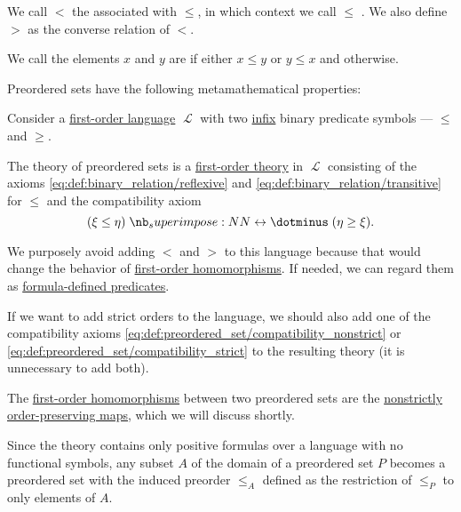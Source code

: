 \begin{definition}
\begin{thmenum}[series=def:preordered_set]
    We call \( < \) the  associated with \( \leq \), in which context we call \( \leq \) . We also define \( > \) as the converse relation of \( < \).

     We call the elements \( x \) and \( y \) are  if either \( x \leq y \) or \( y \leq x \) and  otherwise.
  \end{thmenum}

  Preordered sets have the following metamathematical properties:
  \begin{thmenum}[resume=def:preordered_set]
     Consider a \hyperref[def:first_order_language]{first-order language} \( \mscrL \) with two \hyperref[def:function_application_syntax]{infix} binary predicate symbols --- \( \leq \) and \( \geq \).

    The theory of preordered sets is a \hyperref[def:first_order_theory]{first-order theory} in \( \mscrL \) consisting of the axioms \eqref{eq:def:binary_relation/reflexive} and \eqref{eq:def:binary_relation/transitive} for \( \leq \) and the compatibility axiom
    \begin{equation}\label{eq:def:preordered_set/theory}
      (\xi \leq \eta) \syniff (\eta \geq \xi).
    \end{equation}

    We purposely avoid adding \( < \) and \( > \) to this language because that would change the behavior of \hyperref[def:first_order_homomorphism]{first-order homomorphisms}. If needed, we can regard them as \hyperref[con:formula_defined_predicate]{formula-defined predicates}.

    If we want to add strict orders to the language, we should also add one of the compatibility axioms \eqref{eq:def:preordered_set/compatibility_nonstrict} or \eqref{eq:def:preordered_set/compatibility_strict} to the resulting theory (it is unnecessary to add both).

     The \hyperref[def:first_order_homomorphism]{first-order homomorphisms} between two preordered sets are the \hyperref[def:order_function/preserving]{nonstrictly order-preserving maps}, which we will discuss shortly.

     Since the theory contains only positive formulas over a language with no functional symbols, any subset \( A \) of the domain of a preordered set \( P \) becomes a preordered set with the induced preorder \( \leq_A \) defined as the restriction of \( \leq_P \) to only elements of \( A \).


\end{thmenum}
\end{definition}
